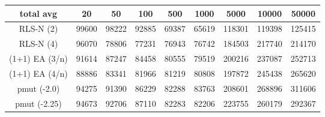 \begin{tabular}[h]{ccccccccc}
total avg&20&50&100&500&1000&5000&10000&50000\\\hline
RLS-N (2)&99600&98222&92885&69387&65619&118301&119398&125415\\
RLS-N (4)&96070&78806&77231&76943&76742&184503&217740&214170\\
(1+1) EA (3/n)&91614&87247&84458&80555&79519&200216&237087&252713\\
(1+1) EA (4/n)&88886&83341&81966&81219&80808&197872&245438&265620\\
pmut (-2.0)&94275&91390&86229&82288&83763&208601&268896&311606\\
pmut (-2.25)&94673&92706&87110&82283&82206&223755&260179&292367\\
\end{tabular}


